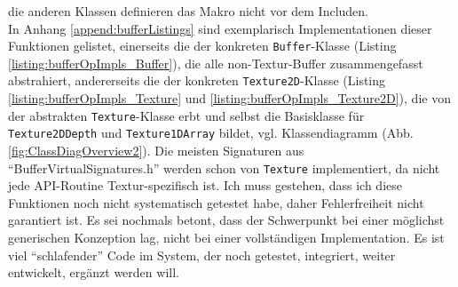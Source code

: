 	die anderen Klassen definieren das Makro nicht vor dem Includen.\\
	
	In Anhang \ref{append:bufferListings} sind exemplarisch Implementationen dieser Funktionen 
	gelistet, einerseits die der konkreten \lstinline|Buffer|-Klasse (Listing \ref{listing:bufferOpImpls_Buffer}),
	 die alle non-Textur-Buffer zusammengefasst abstrahiert, 
	andererseits die der konkreten \lstinline|Texture2D|-Klasse 
	(Listing \ref{listing:bufferOpImpls_Texture} und \ref{listing:bufferOpImpls_Texture2D}), 
	die von der abstrakten \lstinline|Texture|-Klasse erbt und selbst die Basisklasse für
	\lstinline|Texture2DDepth| und \lstinline|Texture1DArray| bildet, 
	vgl. Klassendiagramm (Abb. \ref{fig:ClassDiagOverview2}). Die meisten Signaturen aus "`BufferVirtualSignatures.h"'
	werden schon von \lstinline|Texture| implementiert, da nicht jede API-Routine Textur-spezifisch ist.
	Ich muss gestehen, dass ich diese Funktionen noch nicht systematisch getestet habe, daher Fehlerfreiheit nicht 
	garantiert ist. Es sei nochmals betont, dass der Schwerpunkt bei einer möglichst generischen Konzeption lag,
	nicht bei einer vollständigen Implementation. Es ist viel "`schlafender"' Code im System, der noch getestet, 
	integriert, weiter entwickelt, ergänzt werden will.